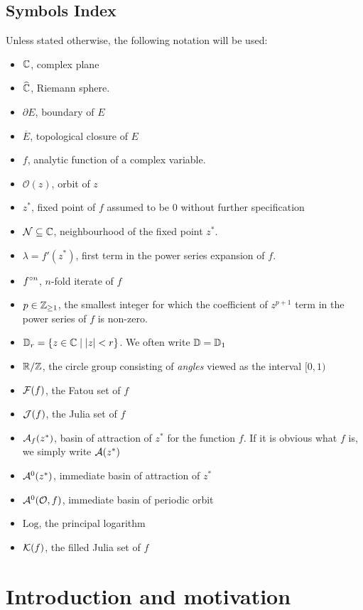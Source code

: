 \documentclass[../main.tex]{subfiles}
\begin{document}
\subsection{Symbols Index} 
Unless stated otherwise, the following notation will be used:
\begin{itemize}
    \item $\mathbb{C}$, complex plane
    \item $\widehat{\mathbb{C}}$, Riemann sphere.
    \item $\partial E$, boundary of $E$
    \item $\overline{E}$, topological closure of $E$
    \item $f$, analytic function of a complex variable.
    \item $\mathcal{O}(z)$, orbit of $z$
    \item $z^*$, fixed point of $f$ assumed to be 0  without further specification
    \item $\mathcal{N} \subseteq \mathbb{C}$, neighbourhood of the fixed point $z^*$.
    \item $\lambda=f'(z^*)$, first term in the power series expansion of $f$.
    \item $f^{\circ n}$, $n$-fold iterate of $f$
    \item $p \in \mathbb{Z}_{\geq 1}$, the smallest integer for which the coefficient of $z^{p+1}$ term in the power series of $f$ is non-zero.
    \item $\mathbb{D}_{r} = \left\{z \in \mathbb{C} \mid \left|z\right| < r \right\}$. We often write $\mathbb{D} = \mathbb{D}_{1}$
    \item $\mathbb{R}/\mathbb{Z}$, the circle group consisting of \emph{angles} viewed as the interval $[0, 1)$
    \item $\mathcal{F}(f)$, the Fatou set of $f$ 
    \item $\mathcal{J}(f)$, the Julia set of $f$
    \item $\mathcal{A}_{f}(z^*)$, basin of attraction of $z^*$ for the function $f$. If it is obvious what $f$ is, we simply write $\mathcal{A}(z^*)$
    \item $\mathcal{A}^0(z^*)$, immediate basin of attraction of $z^*$
    \item $\mathcal{A}^{0}(\mathcal{O}, f)$, immediate basin of periodic orbit
    \item $\mathrm{Log}$, the principal logarithm
    \item $\mathcal{K}{(f)}$, the filled Julia set of $f$
\end{itemize}

\newpage
\section{Introduction and motivation}
\label{sec:intro}
\end{document}
